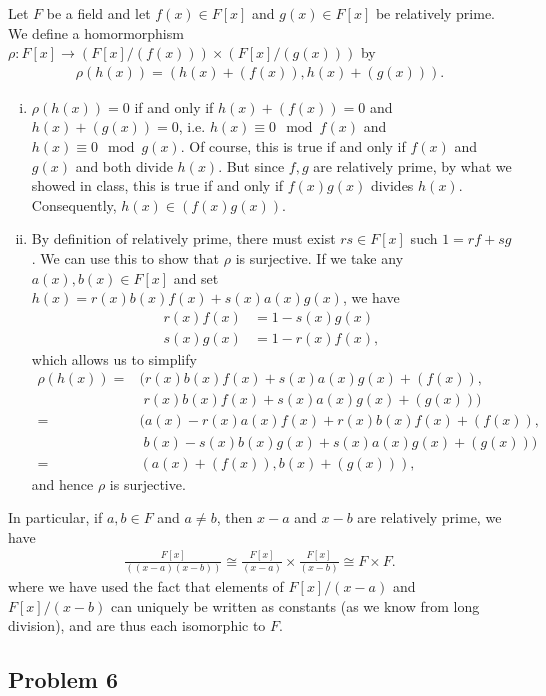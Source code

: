 \documentclass{../../mathnotes}
\begin{document}
Let $F$ be a field and let $f(x)\in F[x]$ and $g(x)\in F[x]$ be relatively prime. We define a homormorphism
$\rho:F[x]\to (F[x]/(f(x)))\times (F[x]/(g(x)))$ by
\begin{align*}
    \rho(h(x))=(h(x)+(f(x)), h(x)+(g(x))).
\end{align*}
\begin{enumerate}[(i)]
    \item $\rho(h(x))=0$ if and only if $h(x)+(f(x))=0$ and $h(x)+(g(x))=0$, i.e. $h(x)\equiv 0\mod f(x)$
        and $h(x)\equiv 0\mod g(x)$. Of course, this is true if and only if $f(x)$ and $g(x)$ and both divide $h(x)$.
        But since $f,g$ are relatively prime, by what we showed in class, this is true if and only if $f(x)g(x)$
        divides $h(x)$. Consequently, $h(x)\in(f(x)g(x))$.
    \item By definition of relatively prime, there must exist $rs\in F[x]$ such $1=rf+sg$. We can use this to show
        that $\rho$ is surjective. If we take any $a(x),b(x)\in F[x]$ and set $h(x)=r(x)b(x)f(x)+s(x)a(x)g(x)$, we
        have
        \begin{align*}
            r(x)f(x)&=1-s(x)g(x)\\
            s(x)g(x)&=1-r(x)f(x),
        \end{align*}
        which allows us to simplify
        \begin{align*}
            \rho(h(x))=&(r(x)b(x)f(x)+s(x)a(x)g(x)+(f(x)),\\
            &\;r(x)b(x)f(x)+s(x)a(x)g(x)+(g(x)))\\
            =&(a(x)-r(x)a(x)f(x)+r(x)b(x)f(x)+(f(x)),\\
            &\;b(x)-s(x)b(x)g(x)+s(x)a(x)g(x)+(g(x)))\\
            =&(a(x)+(f(x)),b(x)+(g(x))),
        \end{align*}
        and hence $\rho$ is surjective.
\end{enumerate}
In particular, if $a,b\in F$ and $a\neq b$, then $x-a$ and $x-b$ are relatively prime, we have
\begin{align*}
    \frac{F[x]}{\left( (x-a)(x-b)\right)}\cong \frac{F[x]}{(x-a)}\times \frac{F[x]}{(x-b)}\cong F\times F.
\end{align*}
where we have used the fact that elements of $F[x]/(x-a)$ and $F[x]/(x-b)$ can uniquely be written
as constants (as we know from long division), and are thus each isomorphic to $F$.

\subsection*{Problem 6}
\end{document}
